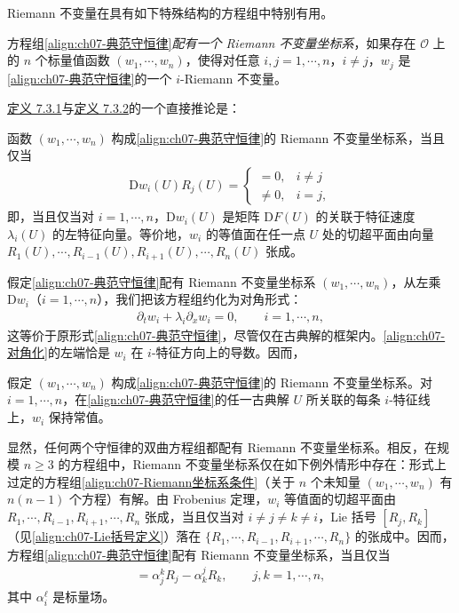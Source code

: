 \documentclass[../../main.tex]{subfiles}
\begin{document}
Riemann 不变量在具有如下特殊结构的方程组中特别有用。

\begin{definition}\label{definition:ch07-Riemann坐标系}
方程组\eqref{align:ch07-典范守恒律}\emph{配有一个 Riemann 不变量坐标系}，如果存在 $\mathscr{O}$ 上的 $n$ 个标量值函数 $(w_1,\cdots,w_n)$，使得对任意 $i,j=1,\cdots,n$，$i\neq j$，$w_j$ 是\eqref{align:ch07-典范守恒律}的一个 $i$-Riemann 不变量。
\end{definition}

\hyperref[definition:ch07-iRiemann不变量]{定义 7.3.1}与\hyperref[definition:ch07-Riemann坐标系]{定义 7.3.2}的一个直接推论是：

\begin{theorem}\label{theorem:ch07-Riemann坐标系等价}
函数 $(w_1,\cdots,w_n)$ 构成\eqref{align:ch07-典范守恒律}的 Riemann 不变量坐标系，当且仅当
\begin{align}
\mathrm{D}w_i(U)R_j(U)=
\begin{cases}
=0,& i\neq j\\
\neq 0,& i=j,
\end{cases}
\label{align:ch07-Riemann坐标系条件}
\end{align}
即，当且仅当对 $i=1,\cdots,n$，$\mathrm{D}w_i(U)$ 是矩阵 $\mathrm{D}F(U)$ 的关联于特征速度 $\lambda_i(U)$ 的左特征向量。等价地，$w_i$ 的等值面在任一点 $U$ 处的切超平面由向量 $R_1(U),\cdots,R_{i-1}(U),R_{i+1}(U),\cdots,R_n(U)$ 张成。
\end{theorem}

假定\eqref{align:ch07-典范守恒律}配有 Riemann 不变量坐标系 $(w_1,\cdots,w_n)$，从左乘 $\mathrm{D}w_i$（$i=1,\cdots,n$），我们把该方程组约化为对角形式：
\begin{align}
\partial_t w_i+\lambda_i\partial_x w_i=0,\qquad i=1,\cdots,n,
\label{align:ch07-对角化}
\end{align}
这等价于原形式\eqref{align:ch07-典范守恒律}，尽管仅在古典解的框架内。\eqref{align:ch07-对角化}的左端恰是 $w_i$ 在 $i$-特征方向上的导数。因而，

\begin{theorem}\label{theorem:ch07-Riemann不变量沿特征线常值}
假定 $(w_1,\cdots,w_n)$ 构成\eqref{align:ch07-典范守恒律}的 Riemann 不变量坐标系。对 $i=1,\cdots,n$，在\eqref{align:ch07-典范守恒律}的任一古典解 $U$ 所关联的每条 $i$-特征线上，$w_i$ 保持常值。
\end{theorem}

显然，任何两个守恒律的双曲方程组都配有 Riemann 不变量坐标系。相反，在规模 $n\geqslant 3$ 的方程组中，Riemann 不变量坐标系仅在如下例外情形中存在：形式上过定的方程组\eqref{align:ch07-Riemann坐标系条件}（关于 $n$ 个未知量 $(w_1,\cdots,w_n)$ 有 $n(n-1)$ 个方程）有解。由 Frobenius 定理，$w_i$ 等值面的切超平面由 $R_1,\cdots,R_{i-1},R_{i+1},\cdots,R_n$ 张成，当且仅当对 $i\neq j\neq k\neq i$，Lie 括号 $[R_j,R_k]$（见\eqref{align:ch07-Lie括号定义}）落在 $\{R_1,\cdots,R_{i-1},R_{i+1},\cdots,R_n\}$ 的张成中。因而，方程组\eqref{align:ch07-典范守恒律}配有 Riemann 不变量坐标系，当且仅当
\begin{align}
[R_j,R_k]=\alpha_j^k R_j-\alpha_k^j R_k,\qquad j,k=1,\cdots,n,
\label{align:ch07-Frobenius条件}
\end{align}
其中 $\alpha_i^\ell$ 是标量场。
\end{document}

